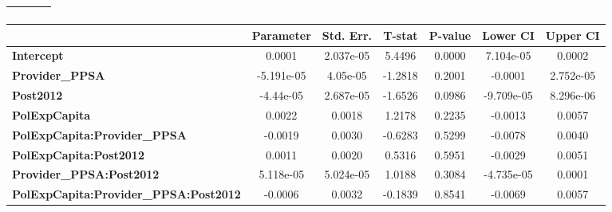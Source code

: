 \begin{center}
\begin{tabular}{lclc}
\textbf{}                                     &                    & \textbf{                     }   &                  \\
\bottomrule
\end{tabular}
\begin{tabular}{lcccccc}
                                              & \textbf{Parameter} & \textbf{Std. Err.} & \textbf{T-stat} & \textbf{P-value} & \textbf{Lower CI} & \textbf{Upper CI}  \\
\midrule
\textbf{Intercept}                            &       0.0001       &     2.037e-05      &      5.4496     &      0.0000      &     7.104e-05     &       0.0002       \\
\textbf{Provider\_PPSA}                       &     -5.191e-05     &      4.05e-05      &     -1.2818     &      0.2001      &      -0.0001      &     2.752e-05      \\
\textbf{Post2012}                             &     -4.44e-05      &     2.687e-05      &     -1.6526     &      0.0986      &     -9.709e-05    &     8.296e-06      \\
\textbf{PolExpCapita}                         &       0.0022       &       0.0018       &      1.2178     &      0.2235      &      -0.0013      &       0.0057       \\
\textbf{PolExpCapita:Provider\_PPSA}          &      -0.0019       &       0.0030       &     -0.6283     &      0.5299      &      -0.0078      &       0.0040       \\
\textbf{PolExpCapita:Post2012}                &       0.0011       &       0.0020       &      0.5316     &      0.5951      &      -0.0029      &       0.0051       \\
\textbf{Provider\_PPSA:Post2012}              &     5.118e-05      &     5.024e-05      &      1.0188     &      0.3084      &     -4.735e-05    &       0.0001       \\
\textbf{PolExpCapita:Provider\_PPSA:Post2012} &      -0.0006       &       0.0032       &     -0.1839     &      0.8541      &      -0.0069      &       0.0057       \\
\bottomrule
\end{tabular}
\end{center}